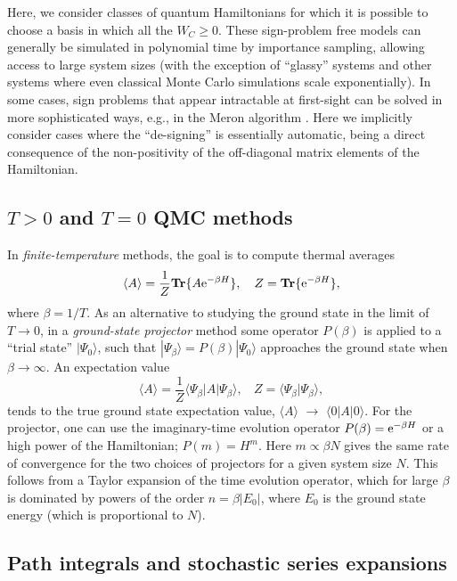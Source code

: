 \documentclass[range]{ar2e}
\begin{document}
Here, we consider classes of quantum Hamiltonians for which it is possible to choose a basis in which all the $W_C\geq 0$. 
These sign-problem free models can generally be simulated in polynomial time by 
importance sampling, allowing access to large system sizes (with the exception of ``glassy'' systems and
other systems where even classical Monte Carlo simulations scale exponentially). In some cases, sign problems that
appear intractable at first-sight can be solved in more sophisticated ways, e.g., in the Meron algorithm \cite{Chandrasekharan99}. 
Here we implicitly consider cases where the ``de-signing'' is essentially automatic, being a direct consequence of the non-positivity of the  
off-diagonal matrix elements of the Hamiltonian.
 
\subsection{$T>0$ and $T=0$ QMC methods}
\label{ss:method}

In {\it finite-temperature} methods, the goal is to compute thermal averages
\begin{equation}
\langle A\rangle = \frac{1}{Z}{\bf Tr}\{ A{\rm e}^{-\beta H}\},~~~
Z = {\bf Tr}\{ {\rm e}^{-\beta H}\},
\label{za1}
\end{equation}
where $\beta=1/T$. As an alternative to studying the ground state in the limit of  $T\to 0$, in a {\it ground-state projector} method some 
operator $P(\beta)$  is applied to a ``trial state'' $|\Psi_0\rangle$, such that $|\Psi_\beta \rangle = P(\beta)|\Psi_0\rangle$ approaches the 
ground state when $\beta \to \infty$. An expectation value
\begin{equation}
\langle A\rangle = \frac{1}{Z}\langle \Psi_\beta|A|\Psi_\beta\rangle,~~~~ Z = \langle \Psi_\beta|\Psi_\beta\rangle,
\label{za2}
\end{equation}
tends to the true ground state expectation value, $\langle A\rangle$ $\to$ $\langle 0| A|0\rangle$. For the projector, one can use the imaginary-time
evolution operator $P(\beta)={\rm e}^{-\beta H}$ or a high power of the Hamiltonian; $P(m)=H^m$. Here $m \propto \beta N$ gives the same rate of 
convergence for the two choices of projectors for a given system size $N$. This follows from a Taylor expansion of the time evolution operator, which for large 
$\beta$ is dominated by powers of the order $n=\beta |E_0|$, where $E_0$ is the ground state energy (which is proportional to $N$).

\subsection{Path integrals and stochastic series expansions}
\end{document}
